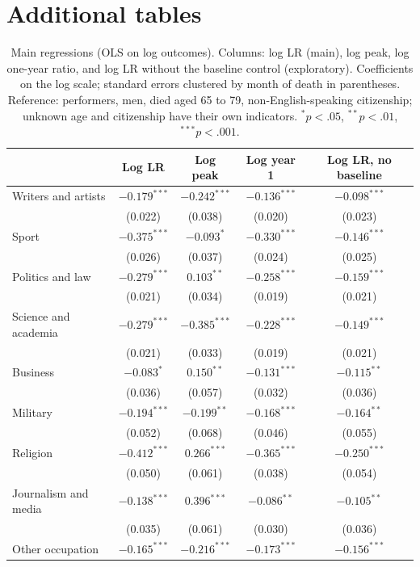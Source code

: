 \documentclass[11pt,a4paper]{article}
\begin{document}
\appendix
\section{Additional tables}
\begin{table}[tbp]\centering\small\caption{Main regressions (OLS on log outcomes). Columns: log LR (main), log peak, log one-year ratio, and log LR without the baseline control (exploratory). Coefficients on the log scale; standard errors clustered by month of death in parentheses. Reference: performers, men, died aged 65 to 79, non-English-speaking citizenship; unknown age and citizenship have their own indicators. $^{*}p<.05$, $^{**}p<.01$, $^{***}p<.001$.}\label{tab:main}\begin{tabular}{lcccc}\toprule & Log LR & Log peak & Log year 1 & Log LR, no baseline\\\midrule
Writers and artists & $-0.179^{***}$ & $-0.242^{***}$ & $-0.136^{***}$ & $-0.098^{***}$\\
 & (0.022) & (0.038) & (0.020) & (0.023)\\
Sport & $-0.375^{***}$ & $-0.093^{*}$ & $-0.330^{***}$ & $-0.146^{***}$\\
 & (0.026) & (0.037) & (0.024) & (0.025)\\
Politics and law & $-0.279^{***}$ & $0.103^{**}$ & $-0.258^{***}$ & $-0.159^{***}$\\
 & (0.021) & (0.034) & (0.019) & (0.021)\\
Science and academia & $-0.279^{***}$ & $-0.385^{***}$ & $-0.228^{***}$ & $-0.149^{***}$\\
 & (0.021) & (0.033) & (0.019) & (0.021)\\
Business & $-0.083^{*}$ & $0.150^{**}$ & $-0.131^{***}$ & $-0.115^{**}$\\
 & (0.036) & (0.057) & (0.032) & (0.036)\\
Military & $-0.194^{***}$ & $-0.199^{**}$ & $-0.168^{***}$ & $-0.164^{**}$\\
 & (0.052) & (0.068) & (0.046) & (0.055)\\
Religion & $-0.412^{***}$ & $0.266^{***}$ & $-0.365^{***}$ & $-0.250^{***}$\\
 & (0.050) & (0.061) & (0.038) & (0.054)\\
Journalism and media & $-0.138^{***}$ & $0.396^{***}$ & $-0.086^{**}$ & $-0.105^{**}$\\
 & (0.035) & (0.061) & (0.030) & (0.036)\\
Other occupation & $-0.165^{***}$ & $-0.216^{***}$ & $-0.173^{***}$ & $-0.156^{***}$\\

\end{tabular}
\end{table}
\end{document}

